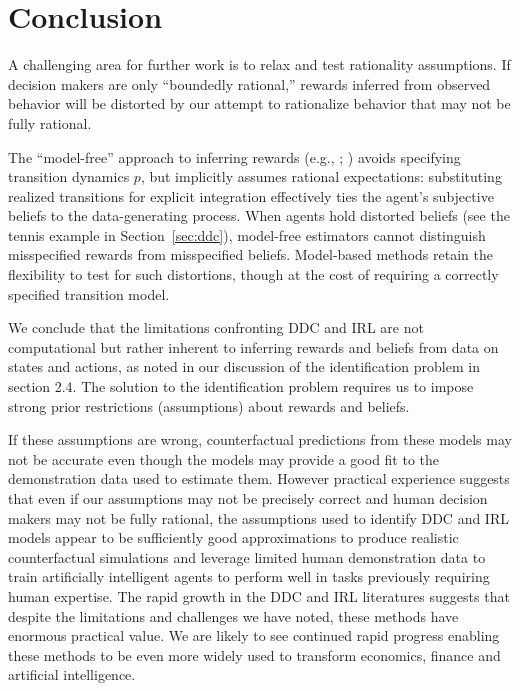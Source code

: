 \section{Conclusion\label{sec:conclusion}}

A challenging area for further work is to relax and test rationality assumptions. If decision makers are only ``boundedly rational,'' rewards inferred from observed behavior will be distorted by our attempt to rationalize behavior that may not be fully rational.

The ``model-free'' approach to inferring rewards (e.g., \citet{AE:2022}; \citet{kang:2025}) avoids specifying transition dynamics $p$, but implicitly assumes rational expectations: substituting realized transitions for explicit integration effectively ties the agent's subjective beliefs to the data-generating process. When agents hold distorted beliefs (see the tennis example in Section~\ref{sec:ddc}), model-free estimators cannot distinguish misspecified rewards from misspecified beliefs. Model-based methods retain the flexibility to test for such distortions, though at the cost of requiring a correctly specified transition model.

We conclude that the limitations confronting DDC and IRL are not computational
but rather inherent to inferring rewards and beliefs
from data on states and actions, as noted in our discussion of the identification problem in
section 2.4. The solution to the identification problem requires us to impose strong
prior restrictions (assumptions) about rewards and
beliefs.

If these assumptions are wrong, counterfactual predictions from these
models may not be accurate even though the models may provide a good fit to the demonstration data
used to estimate them. However practical experience suggests that even if our assumptions
may not be precisely correct and human decision makers may not be fully rational,
the assumptions used to identify DDC and IRL models appear to be sufficiently good approximations to
produce realistic counterfactual simulations and leverage limited human demonstration data to train
artificially intelligent agents to perform well in tasks previously requiring human expertise.
The rapid growth in the DDC and IRL literatures suggests that despite the limitations
and challenges we have noted, these methods have enormous practical value.
We are likely to see continued rapid progress enabling these methods
to be even more widely used to transform economics, finance and  artificial intelligence.





